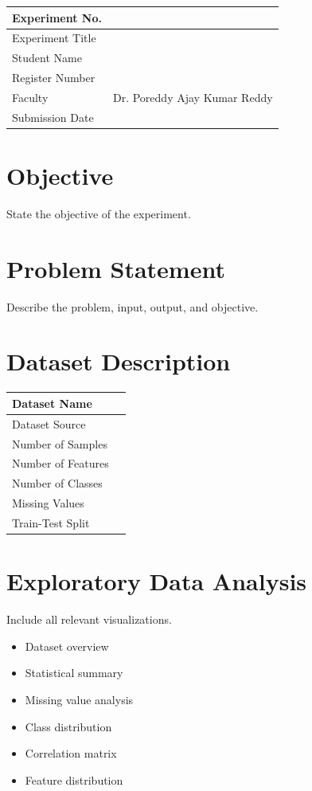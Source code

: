 \documentclass[12pt,a4paper]{article}
\begin{document}
\begin{tabular}{|p{4cm}|p{11cm}|}
\hline
Experiment No. & \\ \hline
Experiment Title & \footnotemark\\ \hline
Student Name & \\ \hline
Register Number & \\ \hline
Faculty & Dr. Poreddy Ajay Kumar Reddy \\ \hline
Submission Date & \\ \hline
\end{tabular}

\section{Objective}
State the objective of the experiment.

\section{Problem Statement}
Describe the problem, input, output, and objective.

\section{Dataset Description}
\begin{longtable}{|p{6cm}|p{8cm}|}
\hline
Dataset Name & \\ \hline
Dataset Source & \\ \hline
Number of Samples & \\ \hline
Number of Features & \\ \hline
Number of Classes & \\ \hline
Missing Values & \\ \hline
Train-Test Split & \\ \hline
\end{longtable}

\section{Exploratory Data Analysis}
Include all relevant visualizations.
\begin{itemize}
\item Dataset overview
\item Statistical summary
\item Missing value analysis
\item Class distribution
\item Correlation matrix
\item Feature distribution
\end{itemize}
\end{document}
